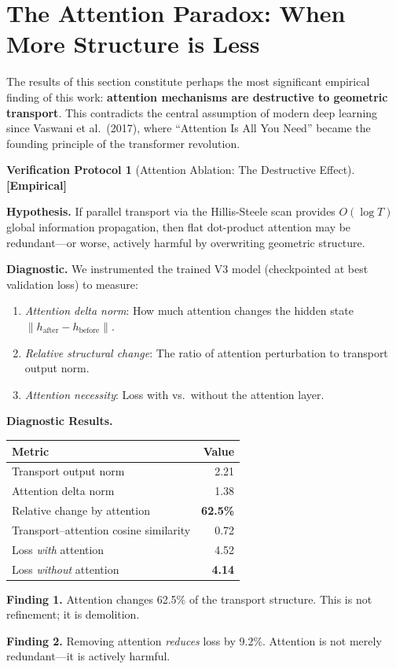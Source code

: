 \documentclass[11pt,a4paper]{article}
\theoremstyle{definition}
\newtheorem{protocol}[theorem]{Verification Protocol}
\theoremstyle{remark}
\newcommand{\statusempirical}{\textcolor{purple!70!black}{\textbf{[Empirical]}}}
\begin{document}
\section{The Attention Paradox: When More Structure is Less}%
\label{sec:attention_paradox}

The results of this section constitute perhaps the most significant 
empirical finding of this work: \textbf{attention mechanisms are 
destructive to geometric transport}. This contradicts the central 
assumption of modern deep learning since Vaswani et al.~(2017), 
where ``Attention Is All You Need'' became the founding principle 
of the transformer revolution.

\begin{protocol}[Attention Ablation: The Destructive 
Effect]\label{prot:attention_ablation}
\statusempirical

\textbf{Hypothesis.} If parallel transport via the Hillis-Steele 
scan provides $O(\log T)$ global information propagation, then 
flat dot-product attention may be redundant---or worse, actively 
harmful by overwriting geometric structure.

\textbf{Diagnostic.} We instrumented the trained V3 model 
(checkpointed at best validation loss) to measure:
\begin{enumerate}[label=(\roman*)]
    \item \emph{Attention delta norm}: How much attention changes 
    the hidden state $\|h_{\text{after}} - h_{\text{before}}\|$.
    \item \emph{Relative structural change}: The ratio of attention 
    perturbation to transport output norm.
    \item \emph{Attention necessity}: Loss with vs.\ without the 
    attention layer.
\end{enumerate}

\textbf{Diagnostic Results.}
\begin{center}
\begin{tabular}{lr}
\toprule
Metric & Value \\
\midrule
Transport output norm & 2.21 \\
Attention delta norm & 1.38 \\
Relative change by attention & \textbf{62.5\%} \\
Transport--attention cosine similarity & 0.72 \\
Loss \emph{with} attention & 4.52 \\
Loss \emph{without} attention & \textbf{4.14} \\
\bottomrule
\end{tabular}
\end{center}

\textbf{Finding 1.} Attention changes 62.5\% of the transport 
structure. This is not refinement; it is demolition.

\textbf{Finding 2.} Removing attention \emph{reduces} loss by 
9.2\%. Attention is not merely redundant---it is actively 
harmful.
\end{protocol}
\end{document}
